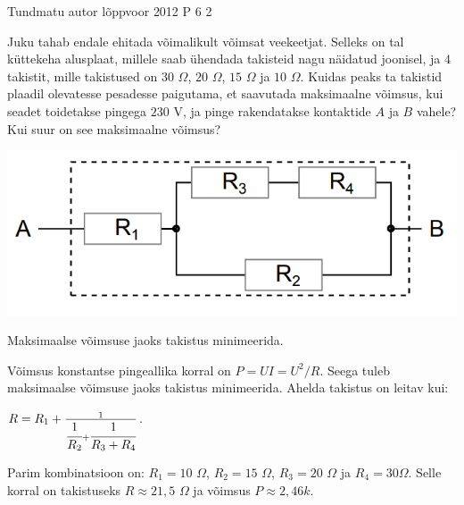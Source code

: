 {Tundmatu autor} %
{lõppvoor} %
{2012} %
{P 6} %
{2} %
{

\ifStatement
Juku tahab endale ehitada võimalikult võimsat veekeetjat. Selleks on tal küttekeha alusplaat, millele saab ühendada takisteid nagu näidatud joonisel, ja $4$ takistit, mille takistused on $30$ $\Omega$, $20$ $\Omega$, $15$ $\Omega$ ja $10$ $\Omega$. Kuidas peaks ta takistid plaadil olevatesse pesadesse paigutama, et saavutada maksimaalne võimsus, kui seadet toidetakse pingega $230$ V, ja pinge rakendatakse kontaktide $A$ ja $B$ vahele? Kui suur on see maksimaalne võimsus?
\begin{center}
	\includegraphics[width=0.5\linewidth]{2012-v3p-06-yl.png}
\end{center}
\fi

\ifHint
Maksimaalse võimsuse jaoks takistus minimeerida.
\fi

\ifSolution
Võimsus konstantse pingeallika korral on $P = U I = U^2 / R$. Seega tuleb maksimaalse võimsuse jaoks takistus minimeerida. Ahelda takistus on leitav kui:
\begin{center}
$R = R_1 + \frac{1}{\cfrac{1}{R_2} + \cfrac{1}{R_3 + R_4}}$.
\end{center}
Parim kombinatsioon on: $R_1 = 10$ $\Omega$, $R_2 = 15$ $\Omega$, $R_3 = 20$ $\Omega$ ja $R_4 =30 \Omega$.
Selle korral on takistuseks $R \approx 21,5$ $\Omega$ ja võimsus $P \approx 2,46 k$.
\fi
}